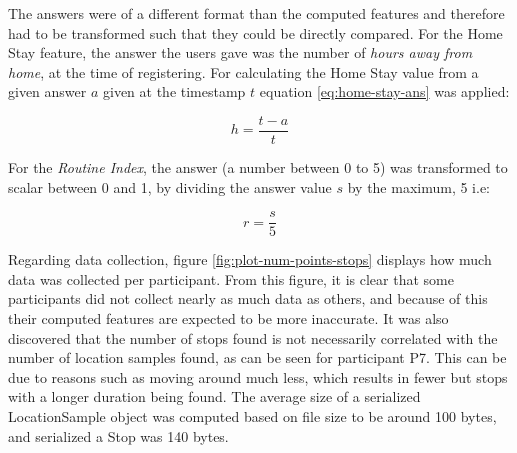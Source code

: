 The answers were of a different format than the computed features and therefore had to be transformed such that they could be directly compared. For the Home Stay feature, the answer the users gave was the number of \textit{hours away from home}, at the time of registering. For calculating the Home Stay value from a given answer $a$ given at the timestamp $t$ equation \ref{eq:home-stay-ans} was applied:

\begin{equation}
\label{eq:home-stay-ans}
    h = \frac{t - a }{t}
\end{equation}

For the \textit{Routine Index}, the answer (a number between 0 to 5) was transformed to scalar between 0 and 1, by dividing the answer value $s$ by the maximum, 5 i.e:

\begin{equation}
\label{eq:routine-ans}
    r = \frac{s}{5}
\end{equation}

Regarding data collection, figure \ref{fig:plot-num-points-stops} displays how much data was collected per participant. From this figure, it is clear that some participants did not collect nearly as much data as others, and because of this their computed features are expected to be more inaccurate. It was also discovered that the number of stops found is not necessarily correlated with the number of location samples found, as can be seen for participant P7. This can be due to reasons such as moving around much less, which results in fewer but stops with a longer duration being found. The average size of a serialized LocationSample object was computed based on file size to be around 100 bytes, and serialized a Stop was 140 bytes.\\  \\

